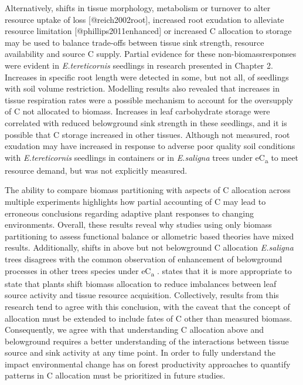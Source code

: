 \documentclass[a4paper]{article}
\begin{document}
Alternatively, shifts in tissue morphology, metabolism or turnover to alter resource uptake of loss [@reich2002root], increased root exudation to alleviate resource limitation [@phillips2011enhanced] or increased C allocation to storage \citep{sala2012carbon, dietze2014nonstructural} may be used to balance trade-offs between tissue sink strength, resource availability and source C supply. Partial evidence for these \textquotesingle non-biomass\textquotesingle responses were evident in \textit{E.tereticornis} seedlings in research presented in Chapter 2. Increases in specific root length were detected in some, but not all, of seedlings with soil volume restriction. Modelling results also revealed that increases in tissue respiration rates were a possible mechanism to account for the oversupply of C not allocated to biomass. Increases in leaf carbohydrate storage were correlated with reduced belowground sink strength in these seedlings, and it is possible that C storage increased in other tissues. Although not measured, root exudation may have increased in response to adverse poor quality soil conditions with \textit{E.tereticornis} seedlings in containers or in \textit{E.saligna} trees under eC\textsubscript{a} to meet resource demand, but was not explicitly measured.

The ability to compare biomass partitioning with aspects of C allocation across multiple experiments highlights how partial accounting of C may lead to erroneous conclusions regarding adaptive plant responses to changing environments. Overall, these results reveal why studies using only biomass partitioning to assess functional balance or allometric based theories have mixed results. Additionally, shifts in above but not belowground C allocation \textit{E.saligna} trees disagrees with the common observation of enhancement of belowground processes in other trees species under eC\textsubscript{a} \citep[see]{palmroth2006aboveground, iversen2014terrestrial}. \citet{shipley2002balanced} states that it is more appropriate to state that plants shift biomass allocation to reduce imbalances between leaf source activity and tissue resource acquisition. Collectively, results from this research tend to agree with this conclusion, with the caveat that the concept of allocation must be extended to include fates of C other than measured biomass. Consequently, we agree with \citet{poorter2012biomass} that understanding C allocation above and belowground requires a better understanding of the interactions between tissue source and sink activity at any time point. In order to fully understand the impact environmental change has on forest productivity approaches to quantify patterns in C allocation must be prioritized in future studies.
\end{document}

